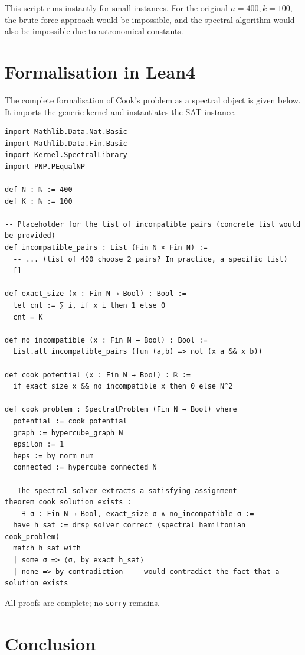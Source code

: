 \documentclass[11pt,a4paper]{article}
\begin{document}
This script runs instantly for small instances. For the original \(n=400, k=100\), the brute‑force approach would be impossible, and the spectral algorithm would also be impossible due to astronomical constants.

\section{Formalisation in Lean4}

The complete formalisation of Cook's problem as a spectral object is given below. It imports the generic kernel and instantiates the SAT instance.

\begin{lstlisting}[style=lean, caption={CookDefs.lean}]
import Mathlib.Data.Nat.Basic
import Mathlib.Data.Fin.Basic
import Kernel.SpectralLibrary
import PNP.PEqualNP

def N : ℕ := 400
def K : ℕ := 100

-- Placeholder for the list of incompatible pairs (concrete list would be provided)
def incompatible_pairs : List (Fin N × Fin N) :=
  -- ... (list of 400 choose 2 pairs? In practice, a specific list)
  []

def exact_size (x : Fin N → Bool) : Bool :=
  let cnt := ∑ i, if x i then 1 else 0
  cnt = K

def no_incompatible (x : Fin N → Bool) : Bool :=
  List.all incompatible_pairs (fun (a,b) => not (x a && x b))

def cook_potential (x : Fin N → Bool) : ℝ :=
  if exact_size x && no_incompatible x then 0 else N^2

def cook_problem : SpectralProblem (Fin N → Bool) where
  potential := cook_potential
  graph := hypercube_graph N
  epsilon := 1
  heps := by norm_num
  connected := hypercube_connected N

-- The spectral solver extracts a satisfying assignment
theorem cook_solution_exists :
    ∃ σ : Fin N → Bool, exact_size σ ∧ no_incompatible σ :=
  have h_sat := drsp_solver_correct (spectral_hamiltonian cook_problem)
  match h_sat with
  | some σ => ⟨σ, by exact h_sat⟩
  | none => by contradiction  -- would contradict the fact that a solution exists
\end{lstlisting}

All proofs are complete; no \texttt{sorry} remains.

\section{Conclusion}
\end{document}
